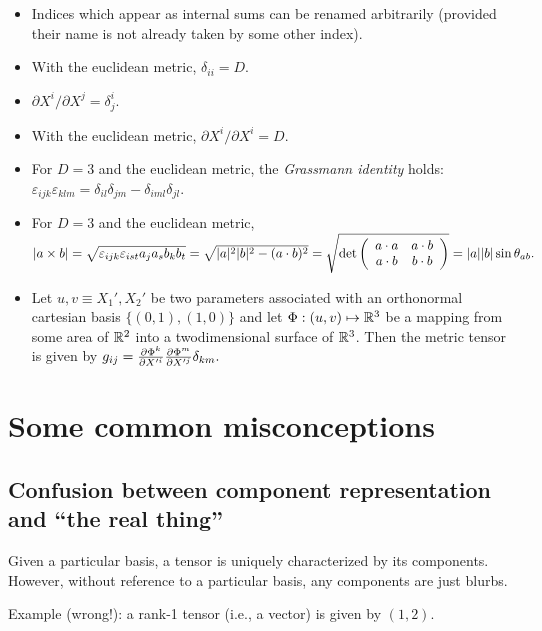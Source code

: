 \begin{itemize}
\item
Indices which appear as internal sums can be renamed arbitrarily
(provided their name is not already taken by some other index).
\item
With the euclidean metric, $\delta_{ii}=D$.
\item
$\partial X^i /\partial X^j=\delta^i_j$.
\item
With the euclidean metric, $\partial X^i /\partial X^i=D$.
\item
For $D=3$ and the euclidean metric,
the {\em Grassmann identity} holds:\\
 $\varepsilon_{ijk}\varepsilon_{klm}
=  \delta_{il}\delta_{jm}-\delta_{iml}\delta_{jl}$.
\item
For $D=3$ and the euclidean metric,\\
$\vert a\times b \vert=
\sqrt{\varepsilon_{ijk}\varepsilon_{ist}a_ja_sb_kb_t}  =
\sqrt{\vert a\vert^2
\vert b\vert^2
-(a\cdot b)^2}=\sqrt{{\rm det}
\left(
\begin{array}{cc}
a\cdot a&a\cdot b\\
a\cdot b&b\cdot b
\end{array}\right)}= \vert a\vert
\vert b\vert \sin \theta_{ab}.$
\item
Let $u,v\equiv X_1',X_2'$ be two parameters associated with an
orthonormal cartesian basis $\{(0,1),(1,0)\}$ and let
$\Phi :(u,v)\mapsto {\Bbb R}^3$
be a mapping from some area of ${\Bbb R}^2$ into a twodimensional
surface of ${\Bbb R}^3$. Then the metric tensor is given by
$g_{ij}=
{\partial \Phi^k \over \partial X'^i}
{\partial \Phi^m \over \partial X'^j} \delta_{km}.$

\end{itemize}

\section{Some common misconceptions}

\subsection{Confusion between component representation and ``the real thing''}
Given a particular basis, a tensor is uniquely characterized by its components.
However, without reference to a particular basis, any components are just blurbs.

Example (wrong!): a rank-1 tensor (i.e., a vector) is given by
$(1,2)$.

